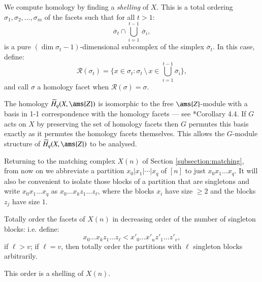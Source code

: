 \documentclass[matann2]{svjour1}
\def\Z{\ams{Z}}
\def\ss{\sigma}
\begin{document}
We compute homology by finding a
\emph{shelling\/} of $X$. This is a 
total ordering $\sigma_1,\sigma_2,\ldots,\sigma_m$ of the
facets such that for all $t>1$:
\begin{equation}
\label{eq5}
    \overline{\sigma}_t
\cap
{\textstyle \bigcup}_{i=1}^{t-1}\,\overline{\sigma}_i,
\end{equation}
is a pure $(\dim \sigma_t-1)$-dimensional subcomplex of 
the simplex $\overline{\sigma}_t$. In this case, define:
\begin{equation}
\label{eq6}
\mathscr{R}(\sigma_t)
=\{x\in{\sigma}_t:
{\sigma}_t\,\setminus\, x\in 
{\textstyle\bigcup}_{i=1}^{t-1}\overline{\sigma}_i\},    
\end{equation}
and call $\ss$ a homology facet when 
$\mathscr{R}(\sigma)=\sigma$. 

The homology
$\widetilde{H}_q(X,\Z)$ is isomorphic to the free $\Z$-module with
a basis in 1-1 correspondence with 
the homology facets
--- see \cite{MR1333388}*{Corollary 4.4}.
If $G$ acts on $X$
by preserving the set of homology facets
then $G$ permutes this basis exactly as it permutes the homology facets
themselves. 
This allows the
$G$-module 
structure of $\widetilde{H}_q(X,\Z)$ to be analysed.


\vspace{1em}


Returning to the matching complex $X(n)$ of Section
\ref{subsection:matching}, 
from now on we abbreviate a
partition $x_0|x_1|\cdots|x_q$ of $[n]$ to just $x_0x_1\ldots x_q$. It
will also be convenient to isolate those blocks of a partition that
are singletons and write $x_0x_1\ldots x_q$ as $x_0\ldots x_kz_1\ldots
z_\ell$, where the blocks $x_i$ have size $\geq 2$ and the blocks
$z_j$ have size $1$.

Totally order the facets of $X(n)$ in decreasing order of the number
of singleton blocks: i.e. define:
$$
x_0\ldots x_k z_1\ldots z_\ell
<
x'_0\ldots x'_u z'_1\ldots z'_v,
$$
if $\ell>v$; if $\ell=v$, then totally order the partitions with 
$\ell$ singleton blocks arbitrarily.

\begin{proposition}
  \label{prop1}
This order is a shelling of $X(n)$.
\end{proposition}
\end{document}
